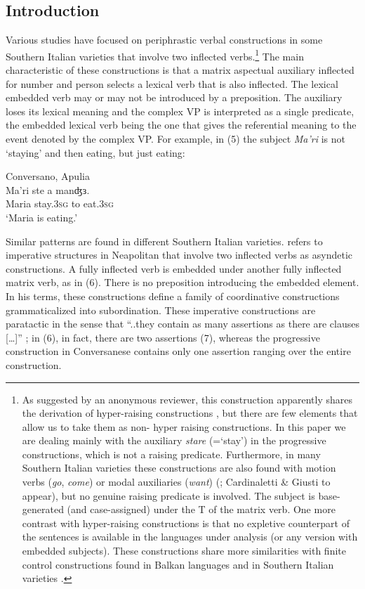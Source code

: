 \documentclass[output=paper]{langsci/langscibook}
\begin{document}
\subsection{Introduction}%

Various studies have focused on periphrastic verbal constructions in some Southern Italian varieties that involve two inflected verbs.\footnote{As suggested by an anonymous reviewer, this construction apparently shares the derivation of hyper-raising constructions \citep{Harford1985,Martins2005,Nunes2008,Zeller2006}, but there are few elements that allow us to take them as non- hyper raising constructions. In this paper we are dealing mainly with the auxiliary \textit{stare} (=‘stay’) in the progressive constructions, which is not a raising predicate. Furthermore, in many Southern Italian varieties these constructions are also found with motion verbs (\textit{go}, \textit{come}) or modal auxiliaries (\textit{want}) (\citealt{Manzini2005,DiCaro2015,Manzini2017,Lorusso2017}; Cardinaletti \& Giusti to appear), but no genuine raising predicate is involved. The subject is base-generated (and case-assigned) under the T of the matrix verb. One more contrast with hyper-raising constructions is that no expletive counterpart of the sentences is available in the languages under analysis (or any version with embedded subjects). These constructions share more similarities with finite control constructions found in Balkan languages \citep{Landau2004,Landau2013,Manzini2000} and in Southern Italian varieties \citep{Manzini2005,Ledgeway2015}.}  The main characteristic of these constructions is that a matrix aspectual auxiliary inflected for number and person selects a lexical verb that is also inflected. The lexical embedded verb may or may not be introduced by a preposition. The auxiliary loses its lexical meaning and the complex VP is interpreted as a single predicate, the embedded lexical verb being the one that gives the referential meaning to the event denoted by the complex VP. For example, in (5) the subject \textit{Ma'ri} is not ‘staying’ and then eating, but just eating:

\ea%
         Conversano, Apulia\label{ex:lorusso:5}\\
    \gll Ma'ri  ste     a   manʤɜ.\\
         Maria  stay.\textsc{3sg}  to  eat.\textsc{3sg}\\
    \glt ‘Maria is eating.’
    \z          

Similar patterns are found in different Southern Italian varieties. \citet{Ledgeway1997} refers to imperative structures in Neapolitan that involve two inflected verbs as asyndetic constructions. A fully inflected verb is embedded under another fully inflected matrix verb, as in (6). There is no preposition introducing the embedded element. In his terms, these constructions define a family of coordinative constructions grammaticalized into subordination. These imperative constructions are paratactic in the sense that “..they contain as many assertions as there are clauses […]” \citep[231]{Ledgeway1997}; in (6), in fact, there are two assertions (7), whereas the progressive construction in Conversanese contains only one assertion ranging over the entire construction.
\end{document}
